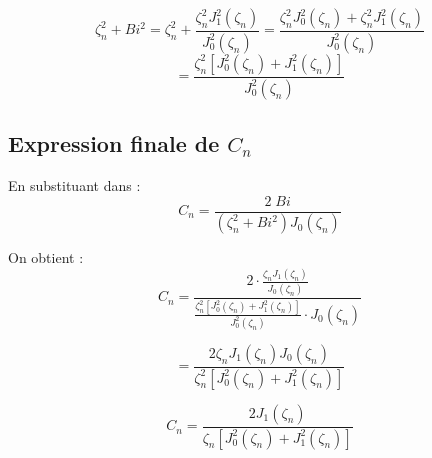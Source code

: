 \documentclass[a4paper,11pt]{article}
\begin{document}
\[
\zeta_n^2 + Bi^2 = \zeta_n^2 + \frac{\zeta_n^2 J_1^2(\zeta_n)}{J_0^2(\zeta_n)} = \frac{\zeta_n^2 J_0^2(\zeta_n) + \zeta_n^2 J_1^2(\zeta_n)}{J_0^2(\zeta_n)}
\]
\[
= \frac{\zeta_n^2 [J_0^2(\zeta_n) + J_1^2(\zeta_n)]}{J_0^2(\zeta_n)}
\]

\subsection*{Expression finale de $C_n$}

En substituant dans :
\[
C_n = \frac{2 \; Bi}{(\zeta_n^2 + Bi^2) J_0(\zeta_n)}
\]

On obtient :
\[
C_n = \frac{2 \cdot \frac{\zeta_n J_1(\zeta_n)}{J_0(\zeta_n)}}{\frac{\zeta_n^2 [J_0^2(\zeta_n) + J_1^2(\zeta_n)]}{J_0^2(\zeta_n)} \cdot J_0(\zeta_n)}
\]

\[
= \frac{2 \zeta_n J_1(\zeta_n) J_0(\zeta_n)}{\zeta_n^2 [J_0^2(\zeta_n) + J_1^2(\zeta_n)]}
\]

\[
\boxed{C_n = \frac{2 J_1(\zeta_n)}{\zeta_n [J_0^2(\zeta_n) + J_1^2(\zeta_n)]}}
\]
\end{document}
